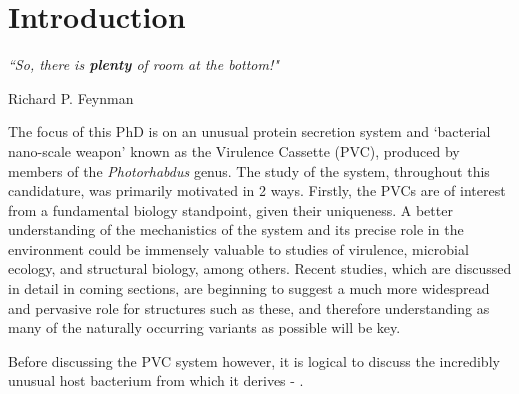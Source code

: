 
\pagestyle{IHA-fancy-style}

\chapter{Introduction}\label{intro}

\epigraph{\textit{``So, there is \textbf{plenty} of room at the bottom!"}}{Richard P. Feynman}

The focus of this PhD is on an unusual protein secretion system and `bacterial nano-scale weapon' known as the \Pa{} Virulence Cassette (PVC), produced by members of the \emph{Photorhabdus} genus. The study of the system, throughout this candidature, was primarily motivated in 2 ways. Firstly, the PVCs are of interest from a fundamental biology standpoint, given their uniqueness. A better understanding of the mechanistics of the system and its precise role in the environment could be immensely valuable to studies of virulence, microbial ecology, and structural biology, among others. Recent studies, which are discussed in detail in coming sections, are beginning to suggest a much more widespread and pervasive role for structures such as these, and therefore understanding as many of the naturally occurring variants as possible will be key. 



Before discussing the PVC system however, it is logical to discuss the incredibly unusual host bacterium from which it derives - \Pa.

